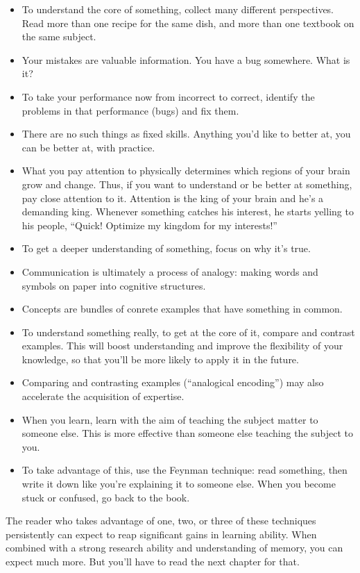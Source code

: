 \begin{itemize}
\itemsep1pt\parskip0pt
\item
  To understand the core of something, collect many different
  perspectives. Read more than one recipe for the same dish, and more
  than one textbook on the same subject.
\item
  Your mistakes are valuable information. You have a bug somewhere. What
  is it?
\item
  To take your performance now from incorrect to correct, identify the
  problems in that performance (bugs) and fix them.
\item
  There are no such things as fixed skills. Anything you'd like to
  better at, you can be better at, with practice.
\item
  What you pay attention to physically determines which regions of your
  brain grow and change. Thus, if you want to understand or be better at
  something, pay close attention to it. Attention is the king of your
  brain and he's a demanding king. Whenever something catches his
  interest, he starts yelling to his people, ``Quick! Optimize my
  kingdom for my interests!''
\item
  To get a deeper understanding of something, focus on why it's true.
\item
  Communication is ultimately a process of analogy: making words and
  symbols on paper into cognitive structures.
\item
  Concepts are bundles of conrete examples that have something in
  common.
\item
  To understand something really, to get at the core of it, compare and
  contrast examples. This will boost understanding and improve the
  flexibility of your knowledge, so that you'll be more likely to apply
  it in the future.
\item
  Comparing and contrasting examples (``analogical encoding'') may also
  accelerate the acquisition of expertise.
\item
  When you learn, learn with the aim of teaching the subject matter to
  someone else. This is more effective than someone else teaching the
  subject to you.
\item
  To take advantage of this, use the Feynman technique: read something,
  then write it down like you're explaining it to someone else. When you
  become stuck or confused, go back to the book.
\end{itemize}

The reader who takes advantage of one, two, or three of these techniques
persistently can expect to reap significant gains in learning ability.
When combined with a strong research ability and understanding of
memory, you can expect much more. But you'll have to read the next
chapter for that.
